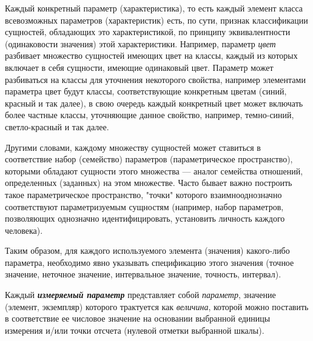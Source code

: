 Каждый конкретный параметр (характеристика), то есть каждый элемент класса всевозможных параметров (характеристик) есть, по сути, признак классификации сущностей, обладающих это характеристикой, по принципу эквивалентности (одинаковости значения) этой характеристики. Например, параметр \textit{цвет} разбивает множество сущностей имеющих цвет на классы, каждый из которых включает в себя сущности, имеющие одинаковый цвет. Параметр может разбиваться на классы для уточнения некоторого свойства, например элементами параметра цвет будут классы, соответствующие конкретным цветам (синий, красный и так далее), в свою очередь каждый конкретный цвет может включать более частные классы, уточняющие данное свойство, например, темно-синий, светло-красный и так далее.
		
Другими словами, каждому множеству сущностей может ставиться в соответствие набор (семейство) параметров (параметрическое пространство), которыми обладают сущности этого множества --- аналог семейства отношений, определенных (заданных) на этом множестве. Часто бывает важно построить такое параметрическое пространство, "точки"{} которого взаимнооднозначно соответствуют параметризуемым сущностям (например, набор параметров, позволяющих однозначно идентифицировать, установить личность каждого человека). 
		
Таким образом, для каждого используемого элемента (значения) какого-либо параметра, необходимо явно указывать спецификацию этого значения (точное значение, неточное значение, интервальное значение, точность, интервал).
		
\begin{SCn}
	
\end{SCn}

Каждый \textbf{\textit{измеряемый параметр}} представляет собой \textit{параметр}, значение (элемент, экземпляр) которого трактуется как \textit{величина}, которой можно поставить в соответствие ее числовое значение на основании выбранной единицы измерения и/или точки отсчета (нулевой отметки выбранной шкалы).

